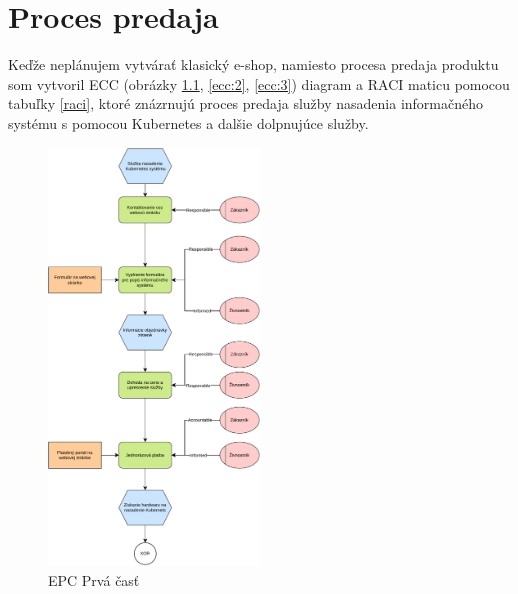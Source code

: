 \chapter{Proces predaja}

Keďže neplánujem vytvárať klasický e-shop, namiesto procesa predaja produktu som vytvoril ECC (obrázky \ref{ecc:1}, \ref{ecc:2}, \ref{ecc:3}) diagram a RACI maticu pomocou tabuľky \ref{raci}, ktoré znázrnujú proces predaja služby nasadenia informačného systému s pomocou Kubernetes a dalšie dolpnujúce služby.


\begin{figure}[htbp]
  \centering
  \includegraphics[width=0.5\textwidth]{images/EPC_1.pdf}
  \caption{EPC Prvá časť}
  \label{ecc:1}
\end{figure}

